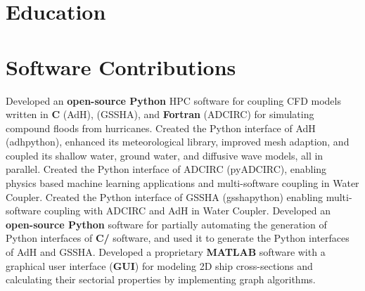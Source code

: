 \documentclass[letterpaper,10pt]{article}
\begin{document}
\section{Education}
  \resumeSubHeadingListStart







  \resumeSubHeadingListEnd
\vspace{-8pt}

\section{Software Contributions}
  \resumeSubItemListStart
      {Developed an \textbf{open-source Python} HPC software for coupling
      CFD models written in \textbf{C} (AdH),
      \textbf{\CC{}} (GSSHA), and \textbf{Fortran} (ADCIRC) for simulating
      compound floods from hurricanes.}
      {Created the Python interface of AdH (adhpython), enhanced its meteorological library,
      improved mesh adaption, and coupled its shallow water, ground
      water, and diffusive wave models, all in parallel.}
      {Created the Python interface of ADCIRC (pyADCIRC), enabling physics
      based machine learning applications and multi-software coupling in Water
      Coupler.}
      {Created the Python interface of GSSHA (gsshapython) enabling
      multi-software coupling with ADCIRC and AdH in Water Coupler.}
      {Developed an \textbf{open-source Python} software for partially
      automating the generation of Python interfaces of \textbf{C/\CC{}}
      software, and used it to generate the Python interfaces of AdH and GSSHA.}
      {Developed a proprietary \textbf{MATLAB} software with a graphical user
      interface (\textbf{GUI}) for modeling 2D ship cross-sections and
      calculating their sectorial properties by implementing graph algorithms.}
  \resumeSubItemListEnd
\vspace{-5pt}
\end{document}
